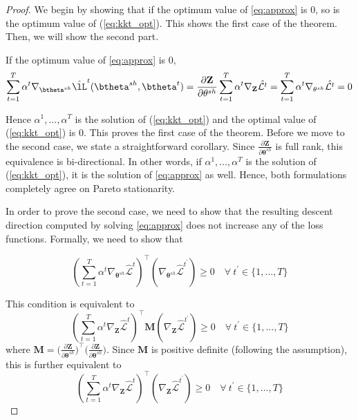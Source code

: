 
\begin{proof}
We begin by showing that if the optimum value of \ref{eq:approx} is 0, so is the optimum value of (\ref{eq:kkt_opt}). This shows the first case of the theorem. Then, we will show the second part.

If the optimum value of \ref{eq:approx} is $0$,
\begin{equation}
\sum_{t=1}^T \alpha^t \nabla_{\btheta^{sh}}  \hat{\lL}^t(\btheta^{sh},\btheta^t) = \frac{\partial \mathbf{Z}}{\partial \mathbf{\theta}^{sh}} \sum_{t=1}^T \alpha^t \nabla_{\mathbf{Z}} \hat{\mathcal{L}^t} = \sum_{t=1}^T \alpha^t \nabla_{\mathbf{\theta}^{sh}} \hat{\mathcal{L}^t}=0
\end{equation}

Hence $\alpha^1,\ldots,\alpha^T$ is the solution of (\ref{eq:kkt_opt}) and the optimal value of (\ref{eq:kkt_opt}) is $0$. This proves the first case of the theorem. Before we move to the second case, we state a straightforward corollary. Since $ \frac{\partial \mathbf{Z}}{\partial \mathbf{\theta}^{sh}}$ is  full rank, this equivalence is bi-directional. In other words, if $\alpha^1,\ldots,\alpha^T$ is the solution of (\ref{eq:kkt_opt}), it is the solution of \ref{eq:approx} as well. Hence, both formulations completely agree on Pareto stationarity.


In order to prove the second case, we need to show that the resulting descent direction computed by solving \ref{eq:approx} does not increase any of the loss functions. Formally, we need to show that

\begin{equation}
\left(\sum_{t=1}^T \alpha^t \nabla_{\mathbf{\theta}^{sh}} \hat{\mathcal{L}}^t\right)^\intercal \left( \nabla_{\mathbf{\theta}^{sh}} \hat{\mathcal{L}}^{t^\prime}  \right) \geq 0 \quad \forall ~t^\prime \in \{1, \ldots, T\}
\end{equation}

This condition is equivalent to
\begin{equation}
\left(\sum_{t=1}^T \alpha^t \nabla_{\mathbf{Z}} \hat{\mathcal{L}}^t\right)^\intercal \mathbf{M} \left(\nabla_{\mathbf{Z}} \hat{\mathcal{L}}^{t^\prime}\right) \geq 0 \quad \forall ~ t^\prime \in \{1, \ldots, T\}
\end{equation}
where $\mathbf{M}=\big(\frac{\partial \mathbf{Z}}{\partial \mathbf{\theta}^{sh}}\big)^\intercal\big(\frac{\partial \mathbf{Z}}{\partial \mathbf{\theta}^{sh}}\big)$. Since $\mathbf{M}$ is positive definite (following the assumption), this is further equivalent to
\begin{equation}
\left(\sum_{t=1}^T \alpha^t \nabla_{\mathbf{Z}} \hat{\mathcal{L}}^t\right)^\intercal  \left(\nabla_{\mathbf{Z}} \hat{\mathcal{L}}^{t^\prime}\right) \geq 0 \quad \forall ~ t^\prime \in \{1, \ldots, T\}
\end{equation}


\end{proof}
